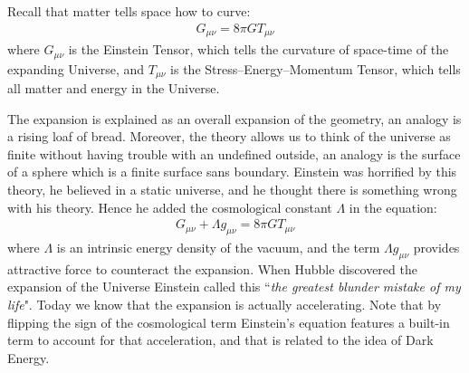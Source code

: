 \documentclass[11pt]{article}
\theoremstyle{break}
\theoremstyle{break}
\begin{document}
Recall that matter tells space how to curve:
\begin{align*}
G_{\mu \nu} = 8\pi G T_{\mu \nu}
\end{align*}
where $G_{\mu\nu}$ is the Einstein Tensor, which tells the curvature of space-time of the expanding Universe, and $T_{\mu\nu}$ is the Stress–Energy–Momentum Tensor, which tells all matter and energy in the Universe. 

The expansion is explained as an overall expansion of the geometry, an analogy is a rising loaf of bread. Moreover, the theory allows us to think of the universe as finite without having trouble with an undefined outside, an  analogy is the surface of a sphere which is a finite surface sans boundary. Einstein was horrified by this theory, he believed in a static universe, and he  thought there is something wrong with his theory. Hence he added the cosmological constant $\Lambda$ in the equation:
\begin{align*}
G_{\mu\nu} + \Lambda g_{\mu \nu} = 8\pi G T_{\mu \nu}
\end{align*}
where $\Lambda$ is an intrinsic energy density of the vacuum, and the term $ \Lambda g_{\mu \nu}$ provides attractive force to counteract the expansion. When Hubble discovered the expansion of the Universe Einstein called this ``\textit{the greatest blunder mistake of my life}". Today we know that the expansion is actually accelerating. Note that by flipping the sign of the cosmological term Einstein's equation features a built-in  term to account for that acceleration, and that is related to the idea of Dark Energy.\\
\end{document}
